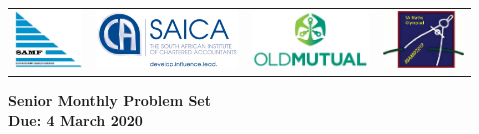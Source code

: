 \documentclass{article}
\begin{document}
\setlength{\tabcolsep}{5pt}
\begin{center} \begin{tabular}{cccc}
	\includegraphics[height=43pt]{SAMF_logo.jpg} &
	\includegraphics[height=43pt]{SAICA_logo.jpg} &
	\includegraphics[height=43pt]{OM_Logo_Stacked_Vignette_on_White_RGB.jpg} &
	\includegraphics[height=43pt]{SAMO2019.png}
\end{tabular} \end{center}


\bigskip


\begin{center}
\textbf{\Large Senior Monthly Problem Set}
\\ \bigskip
\textbf{\large Due: 4 March 2020}
\end{center}
\end{document}
